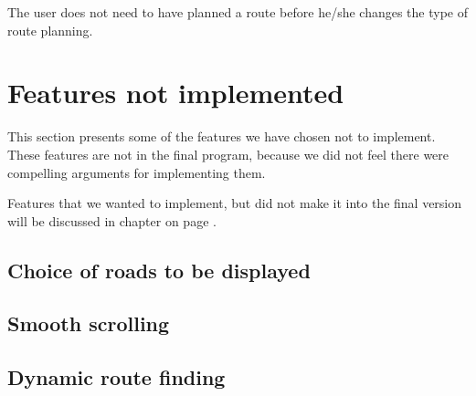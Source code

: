 The user does not need to have planned a route before he/she changes the type of
route planning.
\section{Features not implemented}
\label{UIA-NI}
This section presents some of the features we have chosen not to implement.
These features are not in the final program, because we did not feel there were
compelling arguments for implementing them.

Features that we wanted to implement, but did not make it into the final version
will be discussed in chapter  on page \pageref{PRC}.
\subsection{Choice of roads to be displayed}
\label{UIA-NI-CRD}
\subsection{Smooth scrolling}
\label{UIA-NI-SS}
\subsection{Dynamic route finding}
\label{UIA-NI-DRF}